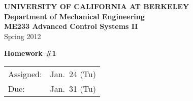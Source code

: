 \documentclass[letterpaper,12pt]{article}
\begin{document}
\begin{center}
    {\bf UNIVERSITY OF CALIFORNIA AT BERKELEY}\\
    {\bf Department of Mechanical Engineering}\\
    {\bf ME233  Advanced Control Systems II}\\
    Spring 2012\\
\end{center}
\noindent
{\Large \bf Homework \#1 }\\[-3em]
\begin{flushright}
\begin{tabular} {l l}
    Assigned: &  Jan.\ 24 (Tu)\\
    Due: & Jan.\ 31 (Tu)
\end{tabular}
\end{flushright}

\begin{enumerate}







\end{enumerate}
\end{document}

